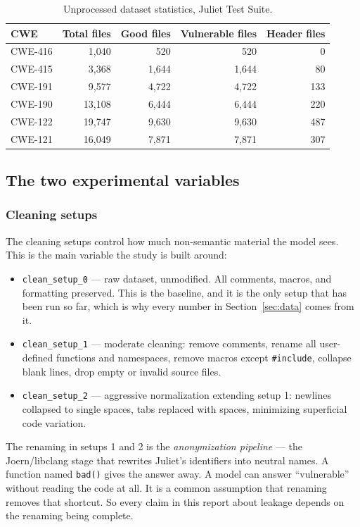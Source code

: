 \documentclass[11pt]{article}
\begin{document}
\begin{table}[h!]
\centering
\begin{tabular}{lrrrr}
\toprule
CWE & Total files & Good files & Vulnerable files & Header files \\
\midrule
CWE-416 & 1,040 & 520 & 520 & 0 \\
CWE-415 & 3,368 & 1,644 & 1,644 & 80 \\
CWE-191 & 9,577 & 4,722 & 4,722 & 133 \\
CWE-190 & 13,108 & 6,444 & 6,444 & 220 \\
CWE-122 & 19,747 & 9,630 & 9,630 & 487 \\
CWE-121 & 16,049 & 7,871 & 7,871 & 307 \\
\bottomrule
\end{tabular}
\caption{Unprocessed dataset statistics, Juliet Test Suite.}
\label{tab:corpus}
\end{table}

\subsection*{The two experimental variables}

\subsubsection*{Cleaning setups}
The cleaning setups control how much non-semantic material the model sees. This is the main
variable the study is built around:

\begin{itemize}[leftmargin=*]
  \item \texttt{clean\_setup\_0} --- raw dataset, unmodified. All comments, macros, and
  formatting preserved. This is the baseline, and it is the only setup that has been run so far,
  which is why every number in Section~\ref{sec:data} comes from it.
  \item \texttt{clean\_setup\_1} --- moderate cleaning: remove comments, rename all user-defined
  functions and namespaces, remove macros except \texttt{\#include}, collapse blank lines, drop
  empty or invalid source files.
  \item \texttt{clean\_setup\_2} --- aggressive normalization extending setup 1: newlines
  collapsed to single spaces, tabs replaced with spaces, minimizing superficial code variation.
\end{itemize}

The renaming in setups 1 and 2 is the \emph{anonymization pipeline} --- the Joern/libclang stage
that rewrites Juliet's identifiers into neutral names. A function named \texttt{bad()} gives the
answer away. A model can answer ``vulnerable'' without reading the code at all. It is a common assumption that renaming removes
that shortcut. So every claim in this report about leakage depends on the renaming being
complete.
\end{document}
